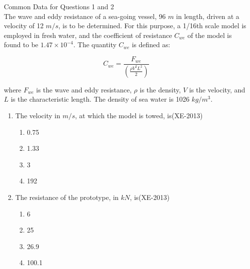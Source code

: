 \iffalse
    \title{Assignment}
    \author{EE24BTECH11033}
    \section{xe}
    \chapter{2013}
  \fi
  
  \item Common Data for Questions 1 and 2 \\
The wave and eddy resistance of a sea-going vessel, 96 $m$ in length, driven at a velocity of 12 $m/s$, is to be determined. For this purpose, a 1/16th scale model is employed in fresh water, and the coefficient of resistance $C_{we}$ of the model is found to be $1.47 \times 10^{-4}$. The quantity $C_{we}$ is defined as:

\[
C_{we} = \frac{F_{we}}{\left(\frac{\rho V^2 L^2}{2}\right)}
\]

where $F_{we}$ is the wave and eddy resistance, $\rho$ is the density, $V$ is the velocity, and $L$ is the characteristic length. The density of sea water is 1026 $kg/m^3$. 

\begin{enumerate}
    \item The velocity in $m/s$, at which the model is towed, is\hfill(XE-2013)
    \begin{multicols}{4}
        \begin{enumerate}
            \item 0.75
            \item 1.33
            \item 3
            \item 192
        \end{enumerate}
    \end{multicols}

    \item The resistance of the prototype, in $kN$, is\hfill(XE-2013)
    \begin{multicols}{4}
	    \begin{enumerate}
            \item 6
            \item 25
            \item 26.9
            \item 100.1
        \end{enumerate}
    \end{multicols}
    \end{enumerate}


